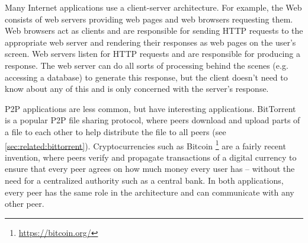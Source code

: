 Many Internet applications use a client-server architecture. For example, the Web consists of web servers providing web pages and web browsers requesting them. Web browsers act as clients and are responsible for sending \gls{HTTP} requests to the appropriate web server and rendering their responses as web pages on the user's screen. Web servers listen for \gls{HTTP} requests and are responsible for producing a response. The web server can do all sorts of processing behind the scenes (e.g. accessing a database) to generate this response, but the client doesn't need to know about any of this and is only concerned with the server's response.

\Acrlong{P2P} applications are less common, but have interesting applications. BitTorrent is a popular \gls{P2P} file sharing protocol, where peers download and upload parts of a file to each other to help distribute the file to all peers (see \ref{sec:related:bittorrent}). Cryptocurrencies such as Bitcoin \footnote{\url{https://bitcoin.org/}} are a fairly recent invention, where peers verify and propagate transactions of a digital currency to ensure that every peer agrees on how much money every user has -- without the need for a centralized authority such as a central bank. In both applications, every peer has the same role in the architecture and can communicate with any other peer.

